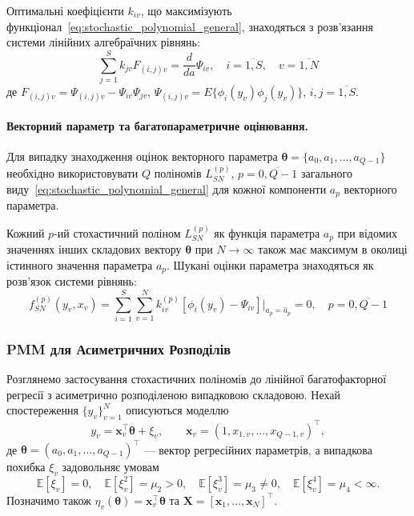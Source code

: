 \documentclass[12pt,a4paper]{article}
\begin{document}
Оптимальні коефіцієнти $k_{iv}$, що максимізують функціонал~\eqref{eq:stochastic_polynomial_general}, знаходяться з розв'язання системи лінійних алгебраїчних рівнянь:
\begin{equation}
\label{eq:optimal_coefficients}
\sum_{j=1}^{S} k_{jv} F_{(i,j)v} = \frac{d}{da} \Psi_{iv}, \quad i=\overline{1,S}, \quad v=\overline{1,N}
\end{equation}
де $F_{(i,j)v} = \Psi_{(i,j)v} - \Psi_{iv} \Psi_{jv}$, $\Psi_{(i,j)v} = E\{\phi_i(y_v)\phi_j(y_v)\}$, $i, j = \overline{1,S}$.

\paragraph{Векторний параметр та багатопараметричне оцінювання.}

Для випадку знаходження оцінок векторного параметра $\boldsymbol{\theta} = \{a_0, a_1, \ldots, a_{Q-1}\}$ необхідно використовувати $Q$ поліномів $L_{SN}^{(p)}$, $p=\overline{0, Q-1}$ загального виду~\eqref{eq:stochastic_polynomial_general} для кожної компоненти $a_p$ векторного параметра.

Кожний $p$-ий стохастичний поліном $L_{SN}^{(p)}$ як функція параметра $a_p$ при відомих значеннях інших складових вектору $\boldsymbol{\theta}$ при $N \to \infty$ також має максимум в околиці істинного значення параметра $a_p$. Шукані оцінки параметра знаходяться як розв'язок системи рівнянь:
\begin{equation}
\label{eq:vector_estimation}
f_{SN}^{(p)}(y_v, x_v) = \sum_{i=1}^{S} \sum_{v=1}^{N} k_{iv}^{(p)} [\phi_i(y_v) - \Psi_{iv}] \bigg|_{a_p=\hat{a}_p} = 0, \quad p=\overline{0,Q-1}
\end{equation}

\subsubsection{PMM для Асиметричних Розподілів}

Розглянемо застосування стохастичних поліномів до лінійної багатофакторної регресії з асиметрично розподіленою випадковою складовою. Нехай спостереження $\{y_v\}_{v=1}^N$ описуються моделлю
\begin{equation}
\label{eq:multiple_regression_model}
y_v = \boldsymbol{x}_v^\top \boldsymbol{\theta} + \xi_v, \qquad \boldsymbol{x}_v = (1, x_{1,v}, \ldots, x_{Q-1,v})^\top,
\end{equation}
де $\boldsymbol{\theta} = (a_0, a_1, \ldots, a_{Q-1})^\top$ --- вектор регресійних параметрів, а випадкова похибка $\xi_v$ задовольняє умовам
\[
\mathbb{E}[\xi_v] = 0,\quad \mathbb{E}[\xi_v^2] = \mu_2 > 0,\quad \mathbb{E}[\xi_v^3] = \mu_3 \neq 0,\quad \mathbb{E}[\xi_v^4] = \mu_4 < \infty.
\]
Позначимо також $\eta_v(\boldsymbol{\theta}) = \boldsymbol{x}_v^\top \boldsymbol{\theta}$ та $\boldsymbol{X} = [\boldsymbol{x}_1, \ldots, \boldsymbol{x}_N]^\top$.
\end{document}
